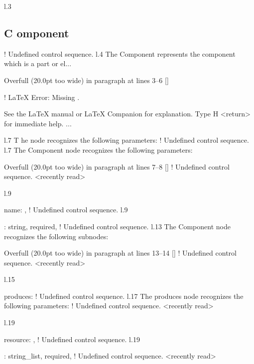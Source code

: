 l.3 \subsection{C
                 omponent}
! Undefined control sequence.
l.4   The \xmlNode
                  {Component} represents the component which is a part or el...


Overfull \hbox (20.0pt too wide) in paragraph at lines 3--6
[]

! LaTeX Error: Missing .

See the LaTeX manual or LaTeX Companion for explanation.
Type  H <return>  for immediate help.
 ...                                              
                                                  
l.7   T
       he  node recognizes the following parameters:
! Undefined control sequence.
l.7   The \xmlNode
                  {Component} node recognizes the following parameters:

Overfull \hbox (20.0pt too wide) in paragraph at lines 7--8
[]
! Undefined control sequence.
<recently read> \xmlAttr 
                         
l.9       \item \xmlAttr
                        {name}: ,
! Undefined control sequence.
l.9       \item {}: \xmlDesc
                                        {string, required},
! Undefined control sequence.
l.13   The \xmlNode
                   {Component} node recognizes the following subnodes:

Overfull \hbox (20.0pt too wide) in paragraph at lines 13--14
[]
! Undefined control sequence.
<recently read> \xmlNode 
                         
l.15     \item \xmlNode
                       {produces}:
! Undefined control sequence.
l.17       The \xmlNode
                       {produces} node recognizes the following parameters:
! Undefined control sequence.
<recently read> \xmlAttr 
                         
l.19           \item \xmlAttr
                             {resource}: ,
! Undefined control sequence.
l.19           \item {}: \xmlDesc
                                                 {string\_list, required},
! Undefined control sequence.
<recently read> \xmlAttr 
                         

